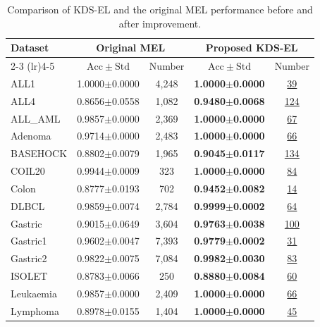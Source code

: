 \begin{table}[!htb]
\centering
\caption{Comparison of KDS-EL and the original MEL performance before and after improvement.}
\label{T7}\label{tab:mechanism_comparison}
\footnotesize
\setlength{\tabcolsep}{2.5pt}
\renewcommand{\arraystretch}{1.08}
\begin{tabular*}{\columnwidth}{@{\extracolsep{\fill}}lcccc@{}}
\toprule
Dataset & \multicolumn{2}{c}{Original MEL} & \multicolumn{2}{c}{Proposed KDS-EL} \\
\cmidrule(lr){2-3} \cmidrule(lr){4-5}
& $\mathrm{Acc} \pm \mathrm{Std}$ & Number & $\mathrm{Acc} \pm \mathrm{Std}$ & Number \\
\midrule
ALL1             & 1.0000$\pm$0.0000 & 4{,}248 & \textbf{1.0000$\pm$0.0000} & \underline{39} \\
ALL4             & 0.8656$\pm$0.0558 & 1{,}082 & \textbf{0.9480$\pm$0.0068} & \underline{124} \\
ALL\_AML         & 0.9857$\pm$0.0000 & 2{,}369 & \textbf{1.0000$\pm$0.0000} & \underline{67} \\
Adenoma          & 0.9714$\pm$0.0000 & 2{,}483 & \textbf{1.0000$\pm$0.0000} & \underline{66} \\
BASEHOCK         & 0.8802$\pm$0.0079 & 1{,}965 & \textbf{0.9045$\pm$0.0117} & \underline{134} \\
COIL20           & 0.9944$\pm$0.0009 &      323 & \textbf{1.0000$\pm$0.0000} & \underline{84} \\
Colon            & 0.8777$\pm$0.0193 &      702 & \textbf{0.9452$\pm$0.0082} & \underline{14} \\
DLBCL            & 0.9859$\pm$0.0074 & 2{,}784 & \textbf{0.9999$\pm$0.0002} & \underline{64} \\
Gastric          & 0.9015$\pm$0.0649 & 3{,}604 & \textbf{0.9763$\pm$0.0038} & \underline{100} \\
Gastric1         & 0.9602$\pm$0.0047 & 7{,}393 & \textbf{0.9779$\pm$0.0002} & \underline{31} \\
Gastric2         & 0.9822$\pm$0.0075 & 7{,}084 & \textbf{0.9982$\pm$0.0030} & \underline{83} \\
ISOLET           & 0.8783$\pm$0.0066 &      250 & \textbf{0.8880$\pm$0.0084} & \underline{60} \\
Leukaemia        & 0.9857$\pm$0.0000 & 2{,}409 & \textbf{1.0000$\pm$0.0000} & \underline{66} \\
Lymphoma         & 0.8978$\pm$0.0155 & 1{,}404 & \textbf{1.0000$\pm$0.0000} & \underline{45} \\

\end{tabular*}
\end{table}
